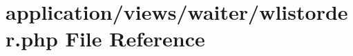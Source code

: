\hypertarget{wlistorder_8php}{}\section{application/views/waiter/wlistorder.php File Reference}
\label{wlistorder_8php}
